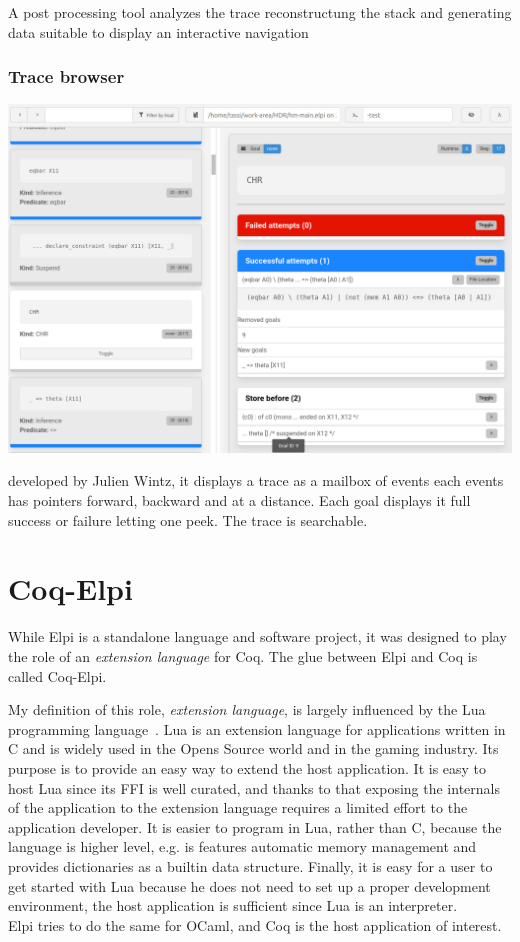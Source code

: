 \documentclass[a4paper, 11pt]{book}
\begin{document}
A post processing tool analyzes the trace reconstructung the
stack and generating data suitable to display an interactive navigation

\subsection{Trace browser}

\includegraphics[width=.9\textwidth]{trace}

developed by Julien Wintz, it displays a trace as a mailbox of events
each events has pointers forward, backward and at a distance.
Each goal displays it full success or failure letting one
peek. The trace is searchable.

\chapter{Coq-Elpi}

While Elpi is a standalone language and software project, it was designed to
play the role of an \emph{extension language} for Coq. The glue between Elpi and
Coq is called Coq-Elpi.

My definition of this role, \emph{extension language}, is largely influenced
by the Lua programming language~\cite{10.5555/1200583}. Lua is an extension
language for applications written in C and is widely used in the Opens Source
world and in the gaming industry.
Its purpose is to provide an easy way to extend the host application.
It is easy to host Lua since its FFI is well curated, and thanks to that
exposing the internals of the application to the extension language requires a
limited effort to the application developer. It is easier to program in Lua,
rather than C, because the language is higher level, e.g. is features automatic
memory management and provides dictionaries as a builtin data structure.
Finally, it is easy for a user to get started with Lua because he does not need
to set up a proper development environment, the host application is sufficient
since Lua is an interpreter.\\
Elpi tries to do the same for OCaml, and Coq is the host application of interest.
\end{document}
